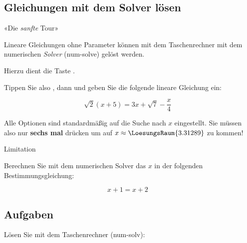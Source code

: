 
\subsection{Gleichungen mit dem Solver lösen}

«Die \textit{sanfte} Tour»

Lineare Gleichungen ohne Parameter können mit dem Taschenrechner mit dem numerischen
\textit{Solver} (num-solve) gelöst werden.

  Hierzu dient die Taste .

  Tippen Sie also , dann  und geben
  Sie die folgende lineare Gleichung ein:

$$\sqrt{2}(x+5) = 3x + \sqrt{7} - \frac{x}4$$

  Alle Optionen sind standardmäßig auf die Suche nach $x$
  eingestellt. Sie müssen also nur \textbf{sechs mal} 
  drücken um auf $x\approx \LoesungsRaum{3.31289}$ zu kommen!

  \begin{bemerkung}{Limitation}{}

    Berechnen Sie mit dem numerischen Solver
     das $x$ in der folgenden
    Bestimmungsgleichung:

    $$x+1=x+2$$
    

    \vspace{10mm}
    
    
  \end{bemerkung}
\newpage
  
\subsection*{Aufgaben}
Lösen Sie mit dem Taschenrechner (num-solv):


\newpage
